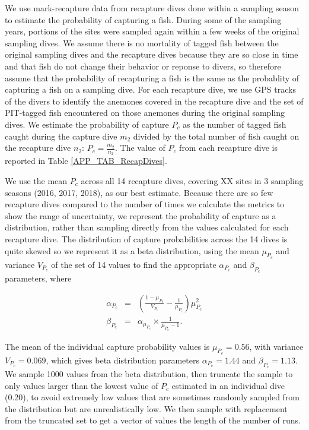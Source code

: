 \documentclass[12pt, oneside]{article}   	%
\begin{document}
We use mark-recapture data from recapture dives done within a sampling season to estimate the probability of capturing a fish. During some of the sampling years, portions of the sites were sampled again within a few weeks of the original sampling dives. We assume there is no mortality of tagged fish between the original sampling dives and the recapture dives because they are so close in time and that fish do not change their behavior or reponse to divers, so therefore assume that the probability of recapturing a fish is the same as the probablity of capturing a fish on a sampling dive. For each recapture dive, we use GPS tracks of the divers to identify the anemones covered in the recapture dive and the set of PIT-tagged fish encountered on those anemones during the original sampling dives. We estimate the probability of capture $P_c$ as the number of tagged fish caught during the capture dive $m_2$ divided by the total number of fish caught on the recapture dive $n_2$: $P_c = \frac{m_2}{n_2}$. The value of $P_c$ from each recapture dive is reported in Table \ref{APP_TAB_RecapDives}.

We use the mean $P_c$ across all 14 recapture dives, covering XX sites in 3 sampling seasons (2016, 2017, 2018), as our best estimate. Because there are so few recapture dives compared to the number of times we calculate the metrics to show the range of uncertainty, we represent the probability of capture as a distribution, rather than sampling directly from the values calculated for each recapture dive. The distribution of capture probabilities across the 14 dives is quite skewed so we represent it as a beta distribution, using the mean $\mu_{P_c}$ and variance $V_{P_c}$ of the set of 14 values to find the appropriate $\alpha_{P_c}$ and $\beta_{P_c}$ parameters, where 

\begin{eqnarray}
\alpha_{P_c} &=& (\frac{1-\mu_{P_c}}{V_{P_c}} - \frac{1}{\mu_{P_c}}) \mu_{P_c}^2 \\
\beta_{P_c} &=& \alpha_{\mu_{P_c}} \times \frac{1}{\mu_{P_c} - 1}. \label{APP_EQN_ProbCapBetaDistParams}  %
\end{eqnarray}


The mean of the individual capture probability values is $\mu_{P_c} = 0.56$, with variance $V_{P_c} = 0.069$, which gives beta distribution parameters $\alpha_{P_c} = 1.44$ and $\beta_{P_c} = 1.13$. We sample 1000 values from the beta distribution, then truncate the sample to only values larger than the lowest value of $P_c$ estimated in an individual dive (0.20), to avoid extremely low values that are sometimes randomly sampled from the distribution but are unrealistically low. We then sample with replacement from the truncated set to get a vector of values the length of the number of runs.
\end{document}
